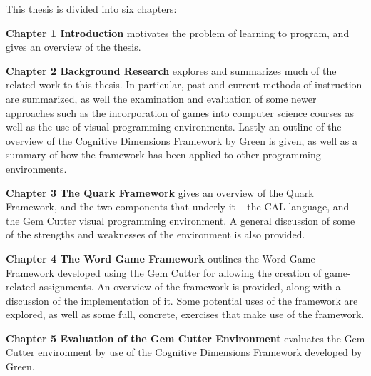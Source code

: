 This thesis is divided into six chapters:  


\textbf{Chapter 1 Introduction} motivates the problem of learning to program, and gives an overview of the thesis.


\textbf{Chapter 2 Background Research} explores and summarizes much of the related work to this thesis.  In particular, past and current methods of instruction are summarized, as well the examination and evaluation of some newer approaches such as the incorporation of games into computer science courses as well as the use of visual programming environments.  Lastly an outline of the overview of the Cognitive Dimensions Framework by Green is given, as well as a summary of how the framework has been applied to other programming environments.

\textbf{Chapter 3 The Quark Framework} gives an overview of the Quark Framework, and the two components that underly it -- the CAL language, and the Gem Cutter visual programming environment.  A general discussion of some of the strengths and weaknesses of the environment is also provided.

	
\textbf{Chapter 4 The Word Game Framework} outlines the Word Game Framework developed using the Gem Cutter for allowing the creation of game-related assignments.  An overview of the framework is provided, along with a discussion of the implementation of it.  Some potential uses of the framework are explored, as well as some full, concrete, exercises that make use of the framework.


\textbf{Chapter 5 Evaluation of the Gem Cutter Environment} evaluates the Gem Cutter environment by use of the Cognitive Dimensions Framework developed by Green.

